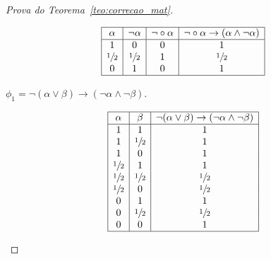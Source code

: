 \begin{proof}[Prova do Teorema~\ref{teo:correcao_mat}]
\begin{provaporcasos}
\begin{provaporsubcasos}
                    \begin{center}
                        \[
                            \begin{array}{|c|c|c|c|}%
                                \hline%
                                \alpha      & \neg \alpha & \neg \circ \alpha & \neg \circ \alpha \to (\alpha \land \neg \alpha)\\
                                \hline%
                                1 & 0 & 0 &1\\
                                \meio{} & \meio{} & 1&\meio{}\\
                                0 & 1 & 0&1\\
                                \hline%
                            \end{array}
                        \]
                    \end{center}
                

                    \subcasodeprova{} $\phi_{1} = \neg (\alpha \lor \beta) \to (\neg \alpha \land \neg \beta)$. 

                    \begin{center}
                        \[
                            \begin{array}{|c|c|c|}%
                                \hline%
                                \alpha      & \beta & \neg (\alpha \lor \beta) \to (\neg \alpha \land \neg \beta) \\
                                \hline%
                                1 & 1 & 1\\
                                1 & \meio{} & 1\\
                                1 & 0 & 1\\
                                \meio{} & 1 & 1\\
                                \meio{} & \meio{} &\meio{}\\ 
                                \meio{} & 0 & \meio{}\\
                                0 & 1 & 1\\
                                0 & \meio{} & \meio{}\\
                                0 & 0 & 1\\
                                \hline%
                            \end{array}
                        \]
                    \end{center}
                    

\end{provaporsubcasos}
\end{provaporcasos}
\end{proof}

